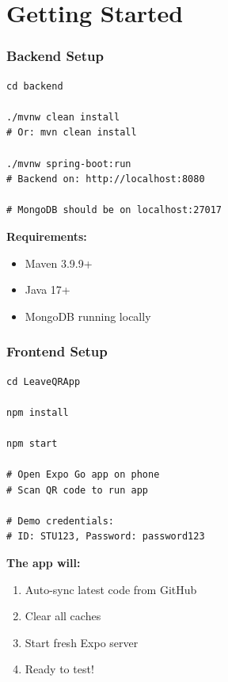 \documentclass[11pt]{beamer}
\begin{document}
\section{Getting Started}

\begin{frame}
\frametitle{Backend Setup}
\begin{lstlisting}
cd backend

./mvnw clean install
# Or: mvn clean install

./mvnw spring-boot:run
# Backend on: http://localhost:8080

# MongoDB should be on localhost:27017
\end{lstlisting}

\vspace{0.5cm}
\textbf{Requirements:}
\begin{itemize}
    \item Maven 3.9.9+
    \item Java 17+
    \item MongoDB running locally
\end{itemize}
\end{frame}

\begin{frame}
\frametitle{Frontend Setup}
\begin{lstlisting}
cd LeaveQRApp

npm install

npm start

# Open Expo Go app on phone
# Scan QR code to run app

# Demo credentials:
# ID: STU123, Password: password123
\end{lstlisting}

\vspace{0.5cm}
\textbf{The app will:}
\begin{enumerate}
    \item Auto-sync latest code from GitHub
    \item Clear all caches
    \item Start fresh Expo server
    \item Ready to test!
\end{enumerate}
\end{frame}
\end{document}
